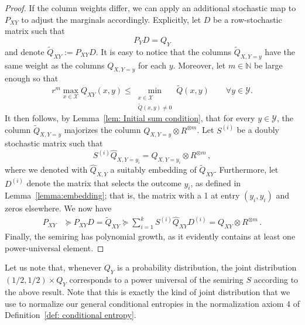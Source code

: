 \documentclass[aps,pra,11pt,onecolumn,nofootinbib,tightenlines]{revtex4-2}
\theoremstyle{definition}
\newcommand{\mc}[1]{\mathcal{#1}}
\newcommand{\mb}[1]{\mathbb{#1}}
\begin{document}
\begin{proof}
If the column weights differ, we can apply an additional stochastic map to $P_{XY}$ to adjust the marginals accordingly. Explicitly, let $D$ be a row-stochastic matrix such that
\begin{equation}
    P_{Y}D=Q_Y
\end{equation}
and denote $\widetilde{Q}_{XY}:=P_{XY}D$. It is easy to notice that the columns $\widetilde{Q}_{X,Y=y}$ have the same weight as the columns $Q_{X,Y=y}$ for each $y$.
Moreover,  let $m\in\mb N$ be large enough so that
\begin{equation}
r^m\max_{x \in\mc X}Q_{XY}(x,y)\leq \min_{\substack{x \in\mc X \\ \widetilde{Q}(x, y) \neq 0}} \widetilde{Q}(x, y) \qquad\forall y\in\mc Y.
\end{equation}
It then follows, by Lemma~\ref{lem: Initial sum condition}, that for every $y \in\mc Y$, the column $\widetilde{Q}_{X,Y=y}$ majorizes the column $Q_{X,Y=y} \otimes R^{\otimes m}$.
Let $S^{(i)}$ be a doubly stochastic matrix such that
\begin{equation}
    S^{(i)} \widehat{Q}_{X,Y=y_i} = Q_{X,Y=y_i} \otimes R^{\otimes m} \,,
\end{equation}
where we denoted with $\widehat{Q}_{X,Y}$ a suitably embedding of $\widetilde{Q}_{XY}$.
Furthermore, let $D^{(i)}$ denote the matrix that selects the outcome $y_i$, as defined in Lemma~\ref{lemma:embedding}; that is, the matrix with a 1 at entry $(y_i, y_i)$ and zeros elsewhere.
We now have
\begin{align}
P_{XY}&\succeq P_{XY}D=\widetilde{Q}_{XY}\succeq\sum_{i=1}^kS^{(i)}\widehat{Q}_{XY}D^{(i)} =  Q_{XY}\otimes R^{\otimes m}\,.
\end{align}
Finally, the semiring has polynomial growth, as it evidently contains at least one power-universal element.

\end{proof}

Let us note that, whenever $Q_Y$ is a probability distribution, the joint distribution $(1/2,1/2)\times Q_Y$ corresponds to a power universal of the semiring $S$ according to the above result. Note that this is exactly the kind of joint distribution that we use to normalize our general conditional entropies in the normalization axiom 4 of Definition~\ref{def: conditional entropy}.
\end{document}
